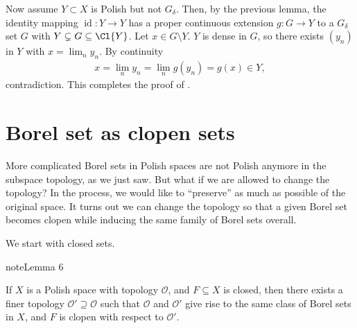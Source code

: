 \documentclass[letterpaper,10pt,english]{jupyterBook}
\begin{document}
\sphinxAtStartPar
Now assume \(Y \subset X\) is Polish but not \(G_\delta\). Then, by the previous lemma, the identity mapping \(\operatorname{id}: Y \to Y\) has a proper continuous extension \(g: G \to Y\) to a \(G_\delta\) set \(G\) with \(Y \subsetneq G \subseteq \Cl{Y}\). Let \(x \in G\setminus Y\). \(Y\) is dense in \(G\), so there exists \((y_n)\) in \(Y\) with \(x = \lim_n y_n\). By continuity
\begin{equation*}
\begin{split}
x = \lim_n y_n = \lim_n g(y_n) = g(x) \in Y,
\end{split}
\end{equation*}
\sphinxAtStartPar
contradiction. This completes the proof of {\hyperref[\detokenize{subsets_Polish:thm-subsets-Polish}]{}}.


\section{Borel set as clopen sets}
\label{\detokenize{subsets_Polish:borel-set-as-clopen-sets}}
\sphinxAtStartPar
More complicated Borel sets in Polish spaces are not Polish anymore in the subspace topology, as we just saw. But what if we are allowed to change the topology? In the process, we would like to “preserve” as much as possible of the original space. It turns out we can change the topology so that a given Borel set becomes clopen while inducing the same family of Borel sets overall.

\sphinxAtStartPar
We start with closed sets.
\label{subsets_Polish:lem-closed-clopen}
\begin{sphinxadmonition}{note}{Lemma 6}



\sphinxAtStartPar
If \(X\) is a Polish space with topology \(\mathcal{O}\), and \(F \subseteq X\) is closed, then there exists a finer topology \(\mathcal{O}' \supseteq \mathcal{O}\) such that \(\mathcal{O}\) and \(\mathcal{O}'\) give rise to the same class of Borel sets in \(X\), and \(F\) is clopen with respect to \(\mathcal{O}'\).
\end{sphinxadmonition}
\end{document}
